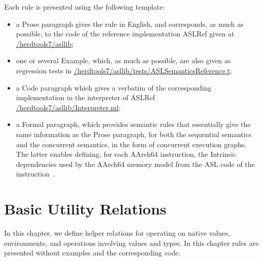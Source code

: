 \documentclass{book}
\begin{document}
Each rule is presented using the following template:
\begin{itemize}
\item a Prose paragraph gives the rule in English, and corresponds, as much as possible, to the code of the reference implementation ASLRef given at
 \href{https://github.com/herd/herdtools7//tree/master/asllib}{/herdtools7/asllib};
\item one or several Example, which, as much as possible, are also given as regression tests in
\href{https://github.com/herd/herdtools7//tree/master/asllib/tests/ASLSemanticsReference.t}{/herdtools7/asllib/tests/ASLSemanticsReference.t};
\item a Code paragraph which gives a verbatim of the corresponding implementation in the interpreter of ASLRef
\href{https://github.com/herd/herdtools7//tree/master/asllib/Interpreter.ml}{/herdtools7/asllib/Interpreter.ml};
\item a Formal paragraph, which provides semantic rules that essentially give the same information as the Prose paragraph, for both
the sequential semantics and the concurrent semantics, in the form of concurrent execution graphs.
The latter enables defining, for each AArch64 instruction,
the Intrinsic dependencies used by the AArch64 memory model from the ASL code of the instruction~\cite[B2.3.2]{ArmARM}.
\end{itemize}

\chapter{Basic Utility Relations \label{chap:utility}}

In this chapter, we define helper relations for operating on native values,
environments, and operations involving values and types.
%
In this chapter rules are presented without examples and the corresponding code.

\newcommand\declarelocalidentifier[0]{\texttt{declare\_local\_identifier}}
\newcommand\declarelocalidentifierm[0]{\texttt{declare\_local\_identifier\_m}}
\newcommand\declarelocalidentifiermm[0]{\texttt{declare\_local\_identifier\_mm}}
\newcommand\removelocal[0]{\texttt{remove\_local}}
\newcommand\readidentifier[0]{\texttt{read\_identifier}}
\newcommand\writeidentifier[0]{\texttt{write\_identifier}}
\newcommand\createbitvector[0]{\texttt{create\_bitvector}}
\newcommand\concatbitvectors[0]{\texttt{concat\_bitvectors}}
\newcommand\readfrombitvector[0]{\texttt{read\_from\_bitvector}}
\newcommand\writetobitvector[0]{\texttt{write\_to\_bitvector}}
\newcommand\asbitvector[0]{\texttt{as\_bitvector}}
\newcommand\slicestopositions[0]{\texttt{slices\_to\_positions}}
\newcommand\getindex[0]{\texttt{get\_index}}
\newcommand\setindex[0]{\texttt{set\_index}}
\newcommand\getfield[0]{\texttt{get\_field}}
\newcommand\setfield[0]{\texttt{set\_field}}
\newcommand\declareglobal[0]{\texttt{declare\_global}}
\newcommand\basevalue[0]{\texttt{base\_value}}
\newcommand\isvaloftype[0]{\texttt{is\_val\_of\_type}}
\end{document}
